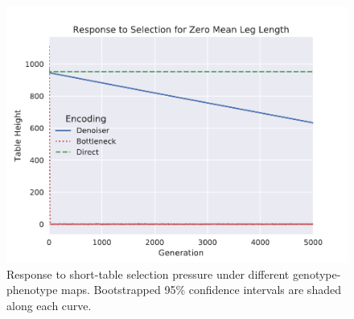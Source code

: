 \begin{figure}
  \includegraphics[width=0.85\linewidth]{img/results/zero_leg_selection}
  \caption{
    Response to short-table selection pressure under different genotype-phenotype maps.
    Bootstrapped 95\% confidence intervals are shaded along each curve.
  }\label{fig:select_response}
\end{figure}
